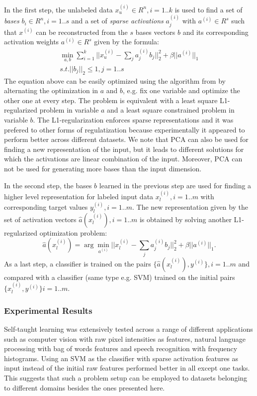 \documentclass[10pt,journal,a4paper]{IEEEtran}
\begin{document}
In the first step, the unlabeled data $x^{(i)}_u \in R^n, i=1..k$ is used to find a set of \textit{bases} $b_i \in R^n, i=1..s$ and a set of \textit{sparse activations} $a_j^{(i)}$ with $a^{(i)}\in R^s$ such that $x^{(i)}$ can
be reconstructed from the $s$ bases vectors $b$ and its corresponding activation weights $a^{(i)} \in R^s$ given by the formula:
\begin{equation}
\begin{array}{c }
	\min_{a,b} \sum_{i=1}^k ||x_u^{(i)} - \sum_j a_j^{(i)} b_j||_2^2 + \beta||a^{(i)}||_1    \\
	 s.t. ||b_j||_2 \leq 1, j=1..s
	\end{array}
\end{equation}
The equation above can be easily optimized using the algorithm from \cite{sparsetraining} by alternating the optimization in $a$ and $b$, e.g. fix one variable and optimize the other one at every step.
The problem is equivalent with a least square L1-regularized problem in variable $a$ and a least square constrained problem in  variable $b$. The L1-regularization enforces sparse representations and it was prefered to other forms of regulatization because experimentally it appeared to perform better across different datasets. We note that PCA can also be used for finding a new representation of the input, but it leads to different solutions for which the activations are linear combination of the input. Moreover,  PCA can not be used for generating more bases than the input dimension.


In the second step, the bases $b$ learned in the previous step are used for finding a higher level representation for labeled input data $x_l^{(i)}, i=1..m$ with corresponding target values $y_l^{(i)}, i=1..m$. The new representation given by the set of activation vectors $\hat{a}(x_l^{(i)}), i=1..m$ is obtained by solving another L1- regularized optimization problem:
\begin{equation}
\hat{a}(x_l^{(i)}) = \arg\min_{a^{(i)}}|| x_l^{(i)} - \sum_j a_j^{(i)}b_j||_2^2 + \beta||a^{(i)}||_1.
\end{equation}
As a last step, a classifier is trained on the pairs $\{\hat{a}(x_l^{(i)}), y^{(i)}\} , i=1..m$ and compared with a classifier (same type e.g. SVM) trained on the initial pairs $\{x_l^{(i)}, y^{(i)}\} i=1..m$.


\subsubsection{Experimental Results}
Self-taught learning was extensively tested across a range of different applications such as computer vision with raw pixel intensities as features, natural language processing with bag of words features and speech recognition with frequency histograms. Using an SVM as the classifier with sparse activation features as input instead of the initial raw features performed better in all except one tasks. This suggests that such a problem setup can be employed to datasets belonging to different domains besides the ones presented here.
\end{document}
